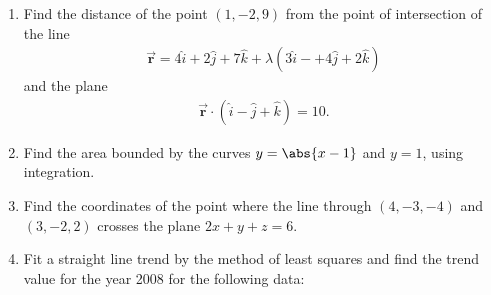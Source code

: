 %
\begin{enumerate}
	\item Find the distance of the point $(1,-2,9)$ from the point of intersection of the line\\ 
		\begin{align*}
			\overrightarrow{\textbf{r}}=4\hat{i}+2\hat{j}+7\hat{k}+\lambda(3\hat{i}-+4\hat{j}+2\hat{k})
		\end{align*}and the plane 
		\begin{align*}
			\overrightarrow{\textbf{r}}\cdot(\hat{i}-\hat{j}+\hat{k})=10.
		\end{align*}
	\item Find the area bounded by the curves $y=\abs{x-1}$ and $y=1$, using integration.
\item Find the coordinates of the point where the line through $(4,-3,-4)$ and $(3,-2,2)$ crosses the plane $2x+y+z=6$.
\item Fit a straight line trend by the method of least squares and find the trend value for the year 2008 for the following data:
	\begin{table}[H]
		
	\end{table}
\end{enumerate}
%

